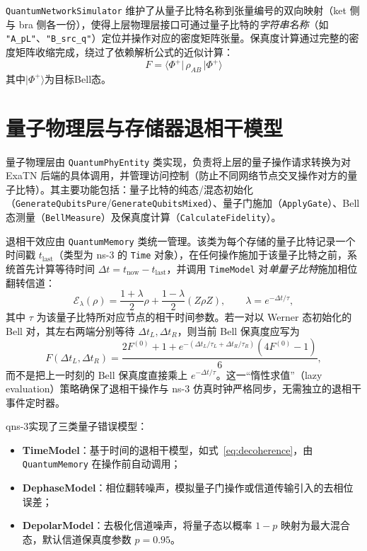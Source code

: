 \texttt{QuantumNetworkSimulator} 维护了从量子比特名称到张量编号的双向映射（ket 侧与 bra 侧各一份），使得上层物理层接口可通过量子比特的\emph{字符串名称}（如 \texttt{"A\_pL"}、\texttt{"B\_src\_q"}）定位并操作对应的密度矩阵张量。保真度计算通过完整的密度矩阵收缩完成，绕过了依赖解析公式的近似计算：
\begin{equation}
  F = \langle\Phi^+\vert\,\rho_{AB}\,\vert\Phi^+\rangle
  \label{eq:fidelity}
\end{equation}
其中$\vert\Phi^+\rangle$为目标Bell态。

\section{量子物理层与存储器退相干模型}
\label{sec:phy-layer}

量子物理层由 \texttt{QuantumPhyEntity} 类实现，负责将上层的量子操作请求转换为对 ExaTN 后端的具体调用，并管理访问控制（防止不同网络节点交叉操作对方的量子比特）。其主要功能包括：量子比特的纯态/混态初始化（\texttt{GenerateQubitsPure}/\texttt{GenerateQubitsMixed}）、量子门施加（\texttt{ApplyGate}）、Bell 态测量（\texttt{BellMeasure}）及保真度计算（\texttt{CalculateFidelity}）。

退相干效应由 \texttt{QuantumMemory} 类统一管理。该类为每个存储的量子比特记录一个时间戳 $t_{\text{last}}$（类型为 ns-3 的 \texttt{Time} 对象），在任何操作施加于该量子比特之前，系统首先计算等待时间 $\Delta t = t_{\text{now}} - t_{\text{last}}$，并调用 \texttt{TimeModel} 对\emph{单量子比特}施加相位翻转信道：
\begin{equation}
  \mathcal{E}_{\lambda}(\rho)
  = \frac{1 + \lambda}{2}\rho
  + \frac{1 - \lambda}{2}(Z\rho Z),
  \qquad
  \lambda = e^{-\Delta t / \tau},
  \label{eq:decoherence}
\end{equation}
其中 $\tau$ 为该量子比特所对应节点的相干时间参数。若一对以 Werner 态初始化的 Bell 对，其左右两端分别等待 $\Delta t_L,\Delta t_R$，则当前 Bell 保真度应写为
\begin{equation}
  F(\Delta t_L, \Delta t_R)
  = \frac{2F^{(0)} + 1 + e^{-(\Delta t_L / \tau_L + \Delta t_R / \tau_R)}(4F^{(0)} - 1)}{6},
  \label{eq:werner-memory-fidelity}
\end{equation}
而不是把上一时刻的 Bell 保真度直接乘上 $e^{-\Delta t/\tau}$。这一“惰性求值”（lazy evaluation）策略确保了退相干操作与 ns-3 仿真时钟严格同步，无需独立的退相干事件定时器。

qns-3实现了三类量子错误模型：
\begin{itemize}
  \item \textbf{TimeModel}：基于时间的退相干模型，如式~\eqref{eq:decoherence}，由 \texttt{QuantumMemory} 在操作前自动调用；
  \item \textbf{DephaseModel}：相位翻转噪声，模拟量子门操作或信道传输引入的去相位误差；
  \item \textbf{DepolarModel}：去极化信道噪声，将量子态以概率 $1-p$ 映射为最大混合态，默认信道保真度参数 $p=0.95$。
\end{itemize}


